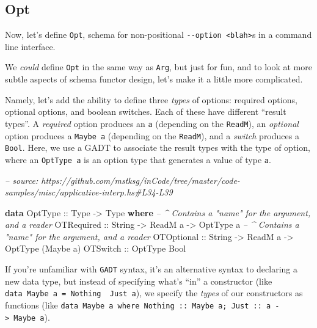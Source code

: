 \documentclass[]{article}
\newenvironment{Shaded}{}{}
\newcommand{\CommentTok}[1]{\textcolor[rgb]{0.38,0.63,0.69}{\textit{#1}}}
\newcommand{\DataTypeTok}[1]{\textcolor[rgb]{0.56,0.13,0.00}{#1}}
\newcommand{\KeywordTok}[1]{\textcolor[rgb]{0.00,0.44,0.13}{\textbf{#1}}}
\newcommand{\NormalTok}[1]{#1}
\newcommand{\OtherTok}[1]{\textcolor[rgb]{0.00,0.44,0.13}{#1}}
\begin{document}
\hypertarget{opt}{%
\subsection{Opt}\label{opt}}

Now, let's define \texttt{Opt}, schema for non-positional
\texttt{-\/-option\ \textless{}blah\textgreater{}}s in a command line interface.

We \emph{could} define \texttt{Opt} in the same way as \texttt{Arg}, but just
for fun, and to look at more subtle aspects of schema functor design, let's make
it a little more complicated.

Namely, let's add the ability to define three \emph{types} of options: required
options, optional options, and boolean switches. Each of these have different
``result types''. A \emph{required} option produces an \texttt{a} (depending on
the \texttt{ReadM}), an \emph{optional} option produces a \texttt{Maybe\ a}
(depending on the \texttt{ReadM}), and a \emph{switch} produces a \texttt{Bool}.
Here, we use a GADT to associate the result types with the type of option, where
an \texttt{OptType\ a} is an option type that generates a value of type
\texttt{a}.

\begin{Shaded}
\begin{Highlighting}[]
\CommentTok{-- source: https://github.com/mstksg/inCode/tree/master/code-samples/misc/applicative-interp.hs#L34-L39}

\KeywordTok{data} \DataTypeTok{OptType}\OtherTok{ ::} \DataTypeTok{Type} \OtherTok{->} \DataTypeTok{Type} \KeywordTok{where}
    \CommentTok{-- ^ Contains a "name" for the argument, and a reader}
    \DataTypeTok{OTRequired}\OtherTok{ ::} \DataTypeTok{String} \OtherTok{->} \DataTypeTok{ReadM}\NormalTok{ a }\OtherTok{->} \DataTypeTok{OptType}\NormalTok{ a}
    \CommentTok{-- ^ Contains a "name" for the argument, and a reader}
    \DataTypeTok{OTOptional}\OtherTok{ ::} \DataTypeTok{String} \OtherTok{->} \DataTypeTok{ReadM}\NormalTok{ a }\OtherTok{->} \DataTypeTok{OptType}\NormalTok{ (}\DataTypeTok{Maybe}\NormalTok{ a)}
    \DataTypeTok{OTSwitch}\OtherTok{   ::} \DataTypeTok{OptType} \DataTypeTok{Bool}
\end{Highlighting}
\end{Shaded}

If you're unfamiliar with \texttt{GADT} syntax, it's an alternative syntax to
declaring a new data type, but instead of specifying what's ``in'' a constructor
(like \texttt{data\ Maybe\ a\ =\ Nothing\ \textbar{}\ Just\ a}), we specify the
\emph{types} of our constructors as functions (like
\texttt{data\ Maybe\ a\ where\ Nothing\ ::\ Maybe\ a;\ Just\ ::\ a\ -\textgreater{}\ Maybe\ a}).
\end{document}
